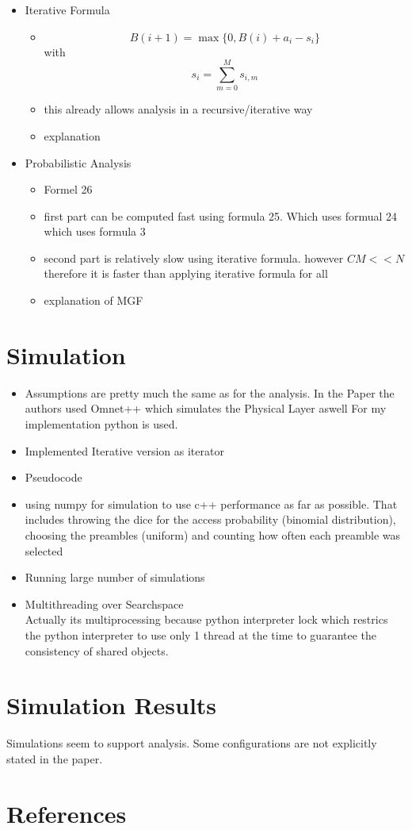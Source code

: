 \documentclass[conference]{IEEEtran}
\begin{document}
\begin{itemize}
\begin{itemize}
    \end{itemize}
    \item Iterative Formula
    \begin{itemize}
        \item \[B(i+1) = \max\{0, B(i)+a_i-s_i\}\] with \[s_i = \sum_{m=0}^Ms_{i,m}\]
        \item this already allows analysis in a recursive/iterative way
        \item explanation
    \end{itemize}
    \item Probabilistic Analysis
    \begin{itemize}
        \item Formel 26
        \item first part can be computed fast using formula 25. Which uses formual 24 which uses formula 3
        \item second part is relatively slow using iterative formula. however $CM<<N$
        therefore it is faster than applying iterative formula for all
        \item explanation of MGF
    \end{itemize}
\end{itemize}
\section{Simulation}
\begin{itemize}
    \item Assumptions
    are pretty much the same as for the analysis.
    In the Paper the authors used Omnet++ which simulates the Physical Layer aswell
    For my implementation python is used.
    \item Implemented Iterative version as iterator
    \item Pseudocode
    \item using numpy for simulation to use c++ performance as far as possible.
    That includes throwing the dice for the access probability (binomial distribution), choosing the preambles (uniform)
    and counting how often each preamble was selected
    \item Running large number of simulations
    \item Multithreading over Searchspace\\
    Actually its multiprocessing because python interpreter lock which restrics the python interpreter to use only
    1 thread at the time to guarantee the consistency of shared objects.
\end{itemize}
\section{Simulation Results}
Simulations seem to support analysis.
Some configurations are not explicitly stated in the paper.
\section*{References}


%
%
\end{document}

